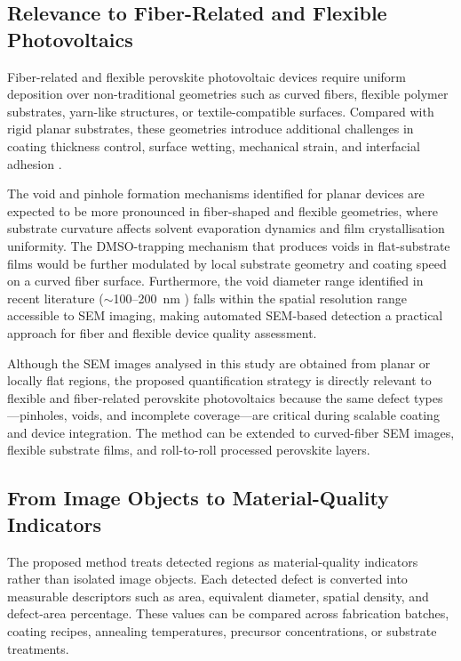 \documentclass[pdflatex,sn-mathphys-num,iicol]{sn-jnl}
\theoremstyle{thmstyleone}
\theoremstyle{thmstyletwo}
\theoremstyle{thmstylethree}
\begin{document}
\subsection{Relevance to Fiber-Related and Flexible Photovoltaics}
\label{subsec:fiber_relevance}

Fiber-related and flexible perovskite photovoltaic devices require
uniform deposition over non-traditional geometries such as curved
fibers, flexible polymer substrates, yarn-like structures, or
textile-compatible surfaces. Compared with rigid planar substrates,
these geometries introduce additional challenges in coating thickness
control, surface wetting, mechanical strain, and interfacial adhesion
\cite{balilonda2019,hu2016,qiu2016,diGiacomo2016}.

The void and pinhole formation mechanisms identified for planar
devices are expected to be more pronounced in fiber-shaped and
flexible geometries, where substrate curvature affects solvent
evaporation dynamics and film crystallisation uniformity. The
DMSO-trapping mechanism that produces voids in flat-substrate films
\cite{chang2026} would be further modulated by local substrate
geometry and coating speed on a curved fiber surface. Furthermore,
the void diameter range identified in recent literature
($\sim$100--200~nm \cite{chang2026}) falls within the spatial
resolution range accessible to SEM imaging, making automated
SEM-based detection a practical approach for fiber and flexible
device quality assessment.

Although the SEM images analysed in this study are obtained from
planar or locally flat regions, the proposed quantification strategy
is directly relevant to flexible and fiber-related perovskite
photovoltaics because the same defect types---pinholes, voids, and
incomplete coverage---are critical during scalable coating and device
integration. The method can be extended to curved-fiber SEM images,
flexible substrate films, and roll-to-roll processed perovskite
layers.

\subsection{From Image Objects to Material-Quality Indicators}
\label{subsec:image_to_material}

The proposed method treats detected regions as material-quality
indicators rather than isolated image objects. Each detected defect
is converted into measurable descriptors such as area, equivalent
diameter, spatial density, and defect-area percentage. These values
can be compared across fabrication batches, coating recipes,
annealing temperatures, precursor concentrations, or substrate
treatments.
\end{document}
